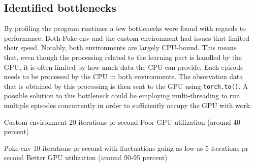 



\subsection{Identified bottlenecks}
\label{sec:bottlenecks}
By profiling the program runtimes a few bottlenecks were found with regards to performance.
Both Poke-env and the custom environment had issues that limited their speed. Notably, both environments are
largely CPU-bound. This means that, even though the processing related to the learning part is handled by the GPU, it is often
limited by how much data the CPU can provide. Each episode needs to be processed by the CPU in both environments. The observation data
that is obtained by this processing is then sent to the GPU using \lstinline|torch.to()|. A possible solution to this bottleneck could
be employing multi-threading to run multiple episodes concurrently in order to sufficiently occupy the GPU with work.

Custom environment 20 iterations pr second
Poor GPU utilization (around 40 percent)

Poke-env 10 iterations pr second with fluctuations going as low as 5 iterations pr second
Better GPU utilization (around 90-95 percent)
